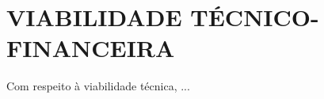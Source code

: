 \section{VIABILIDADE TÉCNICO-FINANCEIRA}
\label{sec:viabilidade}

Com respeito à viabilidade técnica, ...

